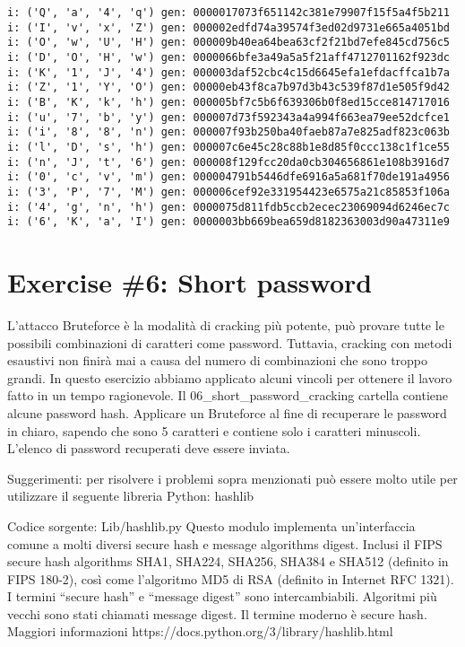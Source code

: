 \documentclass[11pt]{article}
\begin{document}
    \begin{Verbatim}[commandchars=\\\{\}]
i: ('Q', 'a', '4', 'q') gen: 0000017073f651142c381e79907f15f5a4f5b211
i: ('I', 'v', 'x', 'Z') gen: 000002edfd74a39574f3ed02d9731e665a4051bd
i: ('O', 'w', 'U', 'H') gen: 000009b40ea64bea63cf2f21bd7efe845cd756c5
i: ('D', 'O', 'H', 'w') gen: 0000066bfe3a49a5a5f21aff4712701162f923dc
i: ('K', '1', 'J', '4') gen: 000003daf52cbc4c15d6645efa1efdacffca1b7a
i: ('Z', '1', 'Y', 'O') gen: 00000eb43f8ca7b97d3b43c539f87d1e505f9d42
i: ('B', 'K', 'k', 'h') gen: 000005bf7c5b6f639306b0f8ed15cce814717016
i: ('u', '7', 'b', 'y') gen: 000007d73f592343a4a994f663ea79ee52dcfce1
i: ('i', '8', '8', 'n') gen: 000007f93b250ba40faeb87a7e825adf823c063b
i: ('l', 'D', 's', 'h') gen: 000007c6e45c28c88b1e8d85f0ccc138c1f1ce55
i: ('n', 'J', 't', '6') gen: 000008f129fcc20da0cb304656861e108b3916d7
i: ('0', 'c', 'v', 'm') gen: 000004791b5446dfe6916a5a681f70de191a4956
i: ('3', 'P', '7', 'M') gen: 000006cef92e331954423e6575a21c85853f106a
i: ('4', 'g', 'n', 'h') gen: 0000075d811fdb5ccb2ecec23069094d6246ec7c
i: ('6', 'K', 'a', 'I') gen: 0000003bb669bea659d8182363003d90a47311e9

    \end{Verbatim}

    \hypertarget{exercise-6-short-password}{%
\section{Exercise \#6: Short password}\label{exercise-6-short-password}}

    L'attacco Bruteforce è la modalità di cracking più potente, può provare
tutte le possibili combinazioni di caratteri come password. Tuttavia,
cracking con metodi esaustivi non finirà mai a causa del numero di
combinazioni che sono troppo grandi. In questo esercizio abbiamo
applicato alcuni vincoli per ottenere il lavoro fatto in un tempo
ragionevole. Il 06\_short\_password\_cracking cartella contiene alcune
password hash. Applicare un Bruteforce al fine di recuperare le password
in chiaro, sapendo che sono 5 caratteri e contiene solo i caratteri
minuscoli. L'elenco di password recuperati deve essere inviata.

Suggerimenti: per risolvere i problemi sopra menzionati può essere molto
utile per utilizzare il seguente libreria Python: hashlib

Codice sorgente: Lib/hashlib.py Questo modulo implementa un'interfaccia
comune a molti diversi secure hash e message algorithms digest. Inclusi
il FIPS secure hash algorithms SHA1, SHA224, SHA256, SHA384 e SHA512
(definito in FIPS 180-2), così come l'algoritmo MD5 di RSA (definito in
Internet RFC 1321). I termini ``secure hash'' e ``message digest'' sono
intercambiabili. Algoritmi più vecchi sono stati chiamati message
digest. Il termine moderno è secure hash. Maggiori informazioni
https://docs.python.org/3/library/hashlib.html
\end{document}

